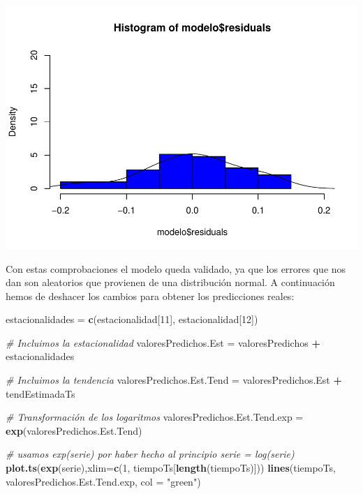 \documentclass[]{article}
\newenvironment{Shaded}{\begin{snugshade}}{\end{snugshade}}
\newcommand{\KeywordTok}[1]{\textcolor[rgb]{0.13,0.29,0.53}{\textbf{#1}}}
\newcommand{\DataTypeTok}[1]{\textcolor[rgb]{0.13,0.29,0.53}{#1}}
\newcommand{\DecValTok}[1]{\textcolor[rgb]{0.00,0.00,0.81}{#1}}
\newcommand{\StringTok}[1]{\textcolor[rgb]{0.31,0.60,0.02}{#1}}
\newcommand{\CommentTok}[1]{\textcolor[rgb]{0.56,0.35,0.01}{\textit{#1}}}
\newcommand{\OperatorTok}[1]{\textcolor[rgb]{0.81,0.36,0.00}{\textbf{#1}}}
\newcommand{\NormalTok}[1]{#1}
\begin{document}
\includegraphics{timeSeries_files/figure-latex/unnamed-chunk-32-1.pdf}

Con estas comprobaciones el modelo queda validado, ya que los errores
que nos dan son aleatorios que provienen de una distribución normal. A
continuación hemos de deshacer los cambios para obtener los predicciones
reales:

\begin{Shaded}
\begin{Highlighting}[]
\NormalTok{estacionalidades =}\StringTok{ }\KeywordTok{c}\NormalTok{(estacionalidad[}\DecValTok{11}\NormalTok{], estacionalidad[}\DecValTok{12}\NormalTok{])}

\CommentTok{# Incluimos la estacionalidad }
\NormalTok{valoresPredichos.Est =}\StringTok{ }\NormalTok{valoresPredichos }\OperatorTok{+}\StringTok{ }\NormalTok{estacionalidades}

\CommentTok{# Incluimos la tendencia }
\NormalTok{valoresPredichos.Est.Tend =}\StringTok{ }\NormalTok{valoresPredichos.Est }\OperatorTok{+}\StringTok{ }\NormalTok{tendEstimadaTs}

\CommentTok{# Transformación de los logaritmos }
\NormalTok{valoresPredichos.Est.Tend.exp =}\StringTok{ }\KeywordTok{exp}\NormalTok{(valoresPredichos.Est.Tend)}

\CommentTok{# usamos exp(serie) por haber hecho al principio serie = log(serie)}
\KeywordTok{plot.ts}\NormalTok{(}\KeywordTok{exp}\NormalTok{(serie),}\DataTypeTok{xlim=}\KeywordTok{c}\NormalTok{(}\DecValTok{1}\NormalTok{, tiempoTs[}\KeywordTok{length}\NormalTok{(tiempoTs)])) }
\KeywordTok{lines}\NormalTok{(tiempoTs, valoresPredichos.Est.Tend.exp, }\DataTypeTok{col =} \StringTok{"green"}\NormalTok{)}
\end{Highlighting}
\end{Shaded}
\end{document}
